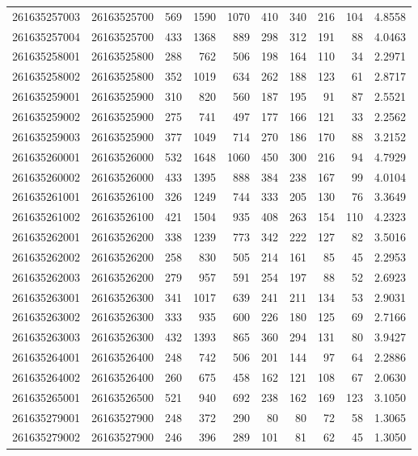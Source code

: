 \documentclass[
  11pt,
]{article}
\begin{document}
\begin{longtable}[t]{llrrrrrrrr}
261635257003 & 26163525700 & 569 & 1590 & 1070 & 410 & 340 & 216 & 104 & 4.8558\\
261635257004 & 26163525700 & 433 & 1368 & 889 & 298 & 312 & 191 & 88 & 4.0463\\
261635258001 & 26163525800 & 288 & 762 & 506 & 198 & 164 & 110 & 34 & 2.2971\\
261635258002 & 26163525800 & 352 & 1019 & 634 & 262 & 188 & 123 & 61 & 2.8717\\
261635259001 & 26163525900 & 310 & 820 & 560 & 187 & 195 & 91 & 87 & 2.5521\\
261635259002 & 26163525900 & 275 & 741 & 497 & 177 & 166 & 121 & 33 & 2.2562\\
261635259003 & 26163525900 & 377 & 1049 & 714 & 270 & 186 & 170 & 88 & 3.2152\\
261635260001 & 26163526000 & 532 & 1648 & 1060 & 450 & 300 & 216 & 94 & 4.7929\\
261635260002 & 26163526000 & 433 & 1395 & 888 & 384 & 238 & 167 & 99 & 4.0104\\
261635261001 & 26163526100 & 326 & 1249 & 744 & 333 & 205 & 130 & 76 & 3.3649\\
261635261002 & 26163526100 & 421 & 1504 & 935 & 408 & 263 & 154 & 110 & 4.2323\\
261635262001 & 26163526200 & 338 & 1239 & 773 & 342 & 222 & 127 & 82 & 3.5016\\
261635262002 & 26163526200 & 258 & 830 & 505 & 214 & 161 & 85 & 45 & 2.2953\\
261635262003 & 26163526200 & 279 & 957 & 591 & 254 & 197 & 88 & 52 & 2.6923\\
261635263001 & 26163526300 & 341 & 1017 & 639 & 241 & 211 & 134 & 53 & 2.9031\\
261635263002 & 26163526300 & 333 & 935 & 600 & 226 & 180 & 125 & 69 & 2.7166\\
261635263003 & 26163526300 & 432 & 1393 & 865 & 360 & 294 & 131 & 80 & 3.9427\\
261635264001 & 26163526400 & 248 & 742 & 506 & 201 & 144 & 97 & 64 & 2.2886\\
261635264002 & 26163526400 & 260 & 675 & 458 & 162 & 121 & 108 & 67 & 2.0630\\
261635265001 & 26163526500 & 521 & 940 & 692 & 238 & 162 & 169 & 123 & 3.1050\\
261635279001 & 26163527900 & 248 & 372 & 290 & 80 & 80 & 72 & 58 & 1.3065\\
261635279002 & 26163527900 & 246 & 396 & 289 & 101 & 81 & 62 & 45 & 1.3050\\

\end{longtable}
\end{document}
